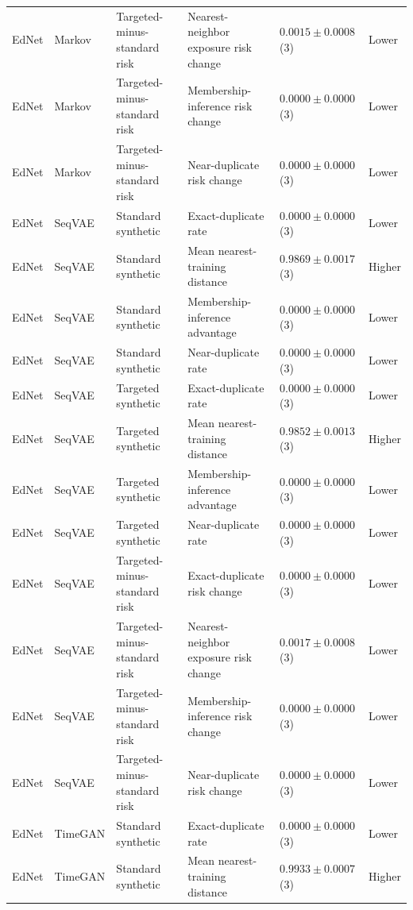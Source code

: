 \begin{longtable}{@{}p{2.25cm}p{2.05cm}p{4.7cm}p{5.0cm}p{2.6cm}p{1.25cm}@{}}
EdNet & Markov & Targeted-minus-standard risk & Nearest-neighbor exposure risk change & $0.0015 \mathbin{\pm} 0.0008$ (3) & Lower \\
EdNet & Markov & Targeted-minus-standard risk & Membership-inference risk change & $0.0000 \mathbin{\pm} 0.0000$ (3) & Lower \\
EdNet & Markov & Targeted-minus-standard risk & Near-duplicate risk change & $0.0000 \mathbin{\pm} 0.0000$ (3) & Lower \\
EdNet & SeqVAE & Standard synthetic & Exact-duplicate rate & $0.0000 \mathbin{\pm} 0.0000$ (3) & Lower \\
EdNet & SeqVAE & Standard synthetic & Mean nearest-training distance & $0.9869 \mathbin{\pm} 0.0017$ (3) & Higher \\
EdNet & SeqVAE & Standard synthetic & Membership-inference advantage & $0.0000 \mathbin{\pm} 0.0000$ (3) & Lower \\
EdNet & SeqVAE & Standard synthetic & Near-duplicate rate & $0.0000 \mathbin{\pm} 0.0000$ (3) & Lower \\
EdNet & SeqVAE & Targeted synthetic & Exact-duplicate rate & $0.0000 \mathbin{\pm} 0.0000$ (3) & Lower \\
EdNet & SeqVAE & Targeted synthetic & Mean nearest-training distance & $0.9852 \mathbin{\pm} 0.0013$ (3) & Higher \\
EdNet & SeqVAE & Targeted synthetic & Membership-inference advantage & $0.0000 \mathbin{\pm} 0.0000$ (3) & Lower \\
EdNet & SeqVAE & Targeted synthetic & Near-duplicate rate & $0.0000 \mathbin{\pm} 0.0000$ (3) & Lower \\
EdNet & SeqVAE & Targeted-minus-standard risk & Exact-duplicate risk change & $0.0000 \mathbin{\pm} 0.0000$ (3) & Lower \\
EdNet & SeqVAE & Targeted-minus-standard risk & Nearest-neighbor exposure risk change & $0.0017 \mathbin{\pm} 0.0008$ (3) & Lower \\
EdNet & SeqVAE & Targeted-minus-standard risk & Membership-inference risk change & $0.0000 \mathbin{\pm} 0.0000$ (3) & Lower \\
EdNet & SeqVAE & Targeted-minus-standard risk & Near-duplicate risk change & $0.0000 \mathbin{\pm} 0.0000$ (3) & Lower \\
EdNet & TimeGAN & Standard synthetic & Exact-duplicate rate & $0.0000 \mathbin{\pm} 0.0000$ (3) & Lower \\
EdNet & TimeGAN & Standard synthetic & Mean nearest-training distance & $0.9933 \mathbin{\pm} 0.0007$ (3) & Higher \\

\end{longtable}
